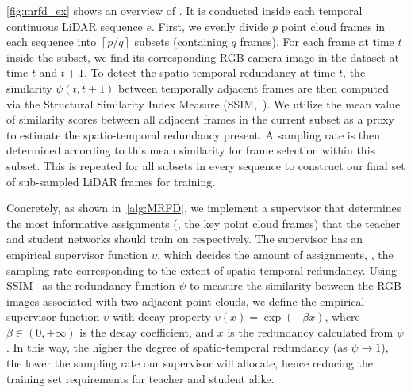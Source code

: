 \documentclass[10pt,twocolumn,letterpaper]{article}
\begin{document}
\cref{fig:mrfd_ex} shows an overview of {\samplshort}. It is conducted inside each temporal continuous LiDAR sequence $e$. First, we evenly divide $p$ point cloud frames in each sequence into $\left\lceil p/q \right\rceil$ subsets (containing $q$ frames). For each frame at time $t$ inside the subset, we find its corresponding RGB camera image in the dataset at time $t$ and $t+1$. To detect the spatio-temporal redundancy at time $t$, the similarity $\psi(t, t+1)$ between temporally adjacent frames are then computed via the Structural Similarity Index Measure (SSIM,~\cite{wang2004image}). We utilize the mean value of similarity scores between all adjacent frames in the current subset as a proxy to estimate the spatio-temporal redundancy present. A sampling rate is then determined according to this mean similarity for frame selection within this subset. This is repeated for all subsets in every sequence to construct our final set of sub-sampled LiDAR frames for training.

Concretely, as shown in~\cref{alg:MRFD}, we implement a {\samplshort} supervisor that determines the most informative assignments (\ie, the key point cloud frames) that the teacher and student networks should train on respectively. The {\samplshort} supervisor has an empirical supervisor function $\upsilon$, which decides the amount of assignments, \ie, the sampling rate corresponding to the extent of spatio-temporal redundancy.  
Using SSIM~\cite{wang2004image} as the redundancy function $\psi$ to measure the similarity between the RGB images associated with two adjacent point clouds, we define the empirical supervisor function $\upsilon$ with decay property $\upsilon (x) = \exp(-\beta x)$, where $\beta \in (0, +\infty)$ is the decay coefficient, and $x$ is the redundancy calculated from $\psi$. In this way, the higher the degree of spatio-temporal redundancy (as $\psi \rightarrow 1$), the lower the sampling rate our {\samplshort} supervisor will allocate, hence reducing the training set requirements for teacher and student alike.
\end{document}
